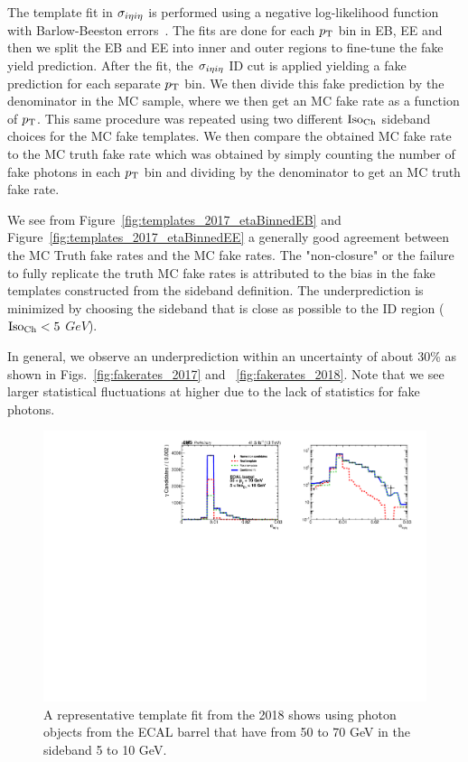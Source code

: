 
The template fit in $\sigma_{i\eta i\eta}$ is performed using a negative log-likelihood function with Barlow-Beeston errors~\cite{BarlowBeeston:1993}. The fits are done for each $p_{\mathrm{T}}$ bin in EB, EE and then we split the EB and EE into inner and outer regions to fine-tune the fake yield prediction. After the fit, the $\sigma_{i\eta i\eta}$ ID cut is applied yielding a fake prediction for each separate $p_{\mathrm{T}}$ bin. We then divide this fake prediction by the denominator in the MC sample, where we then get an MC fake rate as a function of $p_{\mathrm{T}}$. This same procedure was repeated using two different $\text{Iso}_{\text{Ch}}$ sideband choices for the MC fake templates. We then compare the obtained MC fake rate to the MC truth fake rate which was obtained by simply counting the number of fake photons in each $p_{\mathrm{T}}$ bin and dividing by the denominator to get an MC truth fake rate.

We see from Figure~\ref{fig:templates_2017_etaBinnedEB} and Figure~\ref{fig:templates_2017_etaBinnedEE} a generally good agreement between the MC Truth fake rates and the MC fake rates. The "non-closure" or the failure to fully replicate the truth MC fake rates is attributed to the bias in the fake templates constructed from the sideband definition. The underprediction is minimized by choosing the sideband that is close as possible to the ID region ($\text{Iso}_{\text{Ch}} < 5$ $GeV$).

In general, we observe an underprediction within an uncertainty of about 30\% as shown in Figs.~\ref{fig:fakerates_2017} and ~\ref{fig:fakerates_2018}. Note that we see larger statistical fluctuations at higher \pt due to the lack of statistics for fake photons.

\begin{figure}[!htbp]
\centering
\includegraphics[scale=0.83]{fig/fakeRatePlot_all_2017_EB_pT50To70_chIso5To10.pdf}
\caption{A representative template fit from the 2018 shows using photon objects from the ECAL barrel that have \pT from 50 to 70 GeV in the \chiso sideband 5 to 10 GeV.}
\label{fig:templatefit_closure}
\end{figure}

